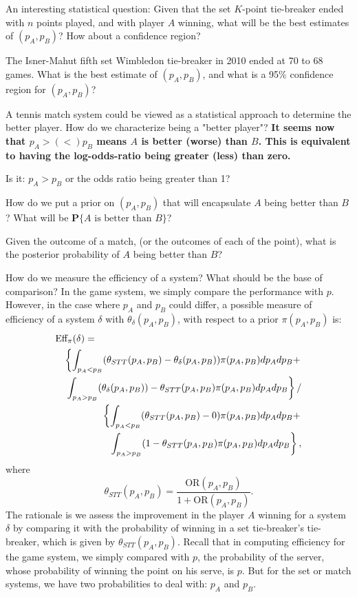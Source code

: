 \documentclass[11pt]{article}
\theoremstyle{plain}
\theoremstyle{definition}
\renewcommand{\Pr}{\mathbf{P}}
\newcommand{\RED}[1]{{\color{red} #1}}
\begin{document}
{\RED{An interesting statistical question: Given that the set $K$-point tie-breaker ended with $n$ points played, and with player $A$ winning, what will be the best estimates of $(p_A,p_B)$? How about a confidence region?}

\RED{The Isner-Mahut fifth set Wimbledon tie-breaker in 2010 ended at 70 to 68 games. What is the best estimate of $(p_A,p_B)$, and what is a 95\% confidence region for $(p_A,p_B)$?}


A tennis match system could be viewed as a statistical approach to determine the better player. How do we characterize being a "better player"? {\bf It seems now that $p_A >(<) p_B$ means $A$ is better (worse) than $B$. This is equivalent to having the log-odds-ratio being greater (less) than zero.}

Is it: $p_A > p_B$ or the odds ratio being greater than 1?

How do we put a prior on $(p_A,p_B)$ that will encapsulate $A$ being better than $B$? What will be $\Pr\{\mbox{$A$ is better than $B$}\}$?

Given the outcome of a match, (or the outcomes of each of the point), what is the posterior probability of $A$ being better than $B$?

How do we measure the efficiency of a system? What should be the base of comparison? In the game system, we simply compare the performance with $p$. However, in the case where $p_A$ and $p_B$ could differ, a possible measure of efficiency of a system $\delta$ with $\theta_\delta(p_A,p_B)$, with respect to a prior $\pi(p_A,p_B)$ is:
%
\begin{eqnarray*}
\lefteqn{ \mbox{Eff}_\pi(\delta) = } \\ &&
\left\{ \int_{p_A < p_B} (\theta_{STT}(p_A,p_B) - \theta_\delta(p_A,p_B)) \pi(p_A,p_B) dp_Adp_B + \right. \\ && \left. \int_{p_A > p_B} ( \theta_\delta(p_A,p_B)) - \theta_{STT}(p_A,p_B) \pi(p_A,p_B) dp_Adp_B \right\} / \\ &&
\left\{\int_{p_A < p_B} (\theta_{STT}(p_A,p_B) - 0) \pi(p_A,p_B) dp_Adp_B + \right. \\ && \left. \int_{p_A > p_B} ( 1 - \theta_{STT}(p_A,p_B) \pi(p_A,p_B) dp_Adp_B \right\},
\end{eqnarray*}
%
where
%
$$\theta_{STT}(p_A,p_B) = \frac{\mbox{OR}(p_A,p_B)}{1 + \mbox{OR}(p_A,p_B)}.$$
%
The rationale is we assess the improvement in the player $A$ winning for a system $\delta$ by comparing it with the probability of winning in a set tie-breaker's tie-breaker, which is given by $\theta_{STT}(p_A,p_B)$. Recall that in computing efficiency for the game system, we simply compared with $p$, the probability of the server, whose probability of winning the point on his serve, is $p$. But for the set or match systems, we have two probabilities to deal with: $p_A$ and $p_B$.

}
\end{document}
